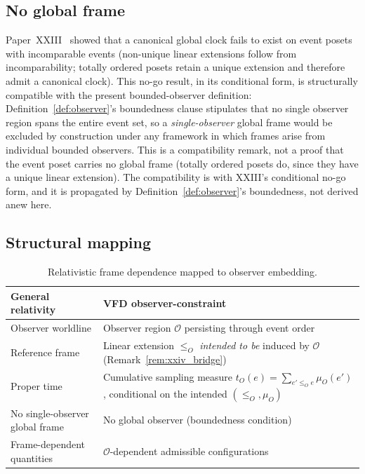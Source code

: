 \documentclass[12pt]{article}
\newcommand{\Ocal}{\mathcal{O}}
\begin{document}
\subsection{No global frame}

Paper~XXIII~\citep{SmartXXIII} showed that a canonical global clock fails to exist on event posets with incomparable events (non-unique linear extensions follow from incomparability; totally ordered posets retain a unique extension and therefore admit a canonical clock). This no-go result, in its conditional form, is structurally compatible with the present bounded-observer definition: Definition~\ref{def:observer}'s boundedness clause stipulates that no single observer region spans the entire event set, so a \emph{single-observer} global frame would be excluded by construction under any framework in which frames arise from individual bounded observers. This is a compatibility remark, not a proof that the event poset carries no global frame (totally ordered posets do, since they have a unique linear extension). The compatibility is with XXIII's conditional no-go form, and it is propagated by Definition~\ref{def:observer}'s boundedness, not derived anew here.

\subsection{Structural mapping}

\begin{table}[ht]
\centering
\caption{Relativistic frame dependence mapped to observer embedding.}
\label{tab:gr}
\begin{tabular}{@{}ll@{}}
\toprule
General relativity & VFD observer-constraint \\
\midrule
Observer worldline & Observer region $\Ocal$ persisting through event order \\
Reference frame & Linear extension $\leq_O$ \emph{intended to be} induced by $\Ocal$ (Remark~\ref{rem:xxiv_bridge}) \\
Proper time & Cumulative sampling measure $t_O(e) = \sum_{e' \leq_O e} \mu_O(e')$, conditional on the intended $(\leq_O, \mu_O)$ \\
No single-observer global frame & No global observer (boundedness condition) \\
Frame-dependent quantities & $\Ocal$-dependent admissible configurations \\
\bottomrule
\end{tabular}
\end{table}
\end{document}
